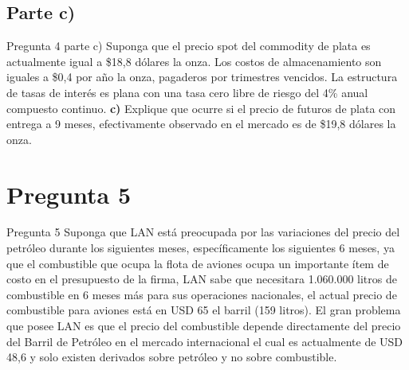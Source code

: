 \documentclass{beamer}
\begin{document}
\subsection{Parte c)}
\begin{frame}{Pregunta 4 parte c)}
  Suponga que el precio spot del commodity de plata es actualmente igual a \$18,8 dólares  
  la onza. Los costos de almacenamiento son iguales a \$0,4 por año la onza, pagaderos por
   trimestres vencidos. La estructura de tasas de interés es plana con una tasa cero libre 
   de riesgo del 4\% anual compuesto continuo.
  \textbf{c)} Explique que ocurre si el precio de futuros de plata con entrega a 9 meses,
  efectivamente observado en el mercado es de \$19,8 dólares la onza.
  
\end{frame}

\section{Pregunta 5}
\begin{frame}{Pregunta 5}
  Suponga que LAN está preocupada por las variaciones del precio del petróleo durante los siguientes meses,
  específicamente los siguientes 6 meses, ya que el combustible que ocupa la flota de aviones ocupa un importante 
  ítem de costo en el presupuesto de la firma, LAN sabe que necesitara 1.060.000 litros de combustible en 6 meses
  más para sus operaciones nacionales, el actual precio de combustible para aviones está en USD 65 el barril (159 litros). 
  El gran problema que posee LAN es que el precio del combustible depende directamente del precio del Barril de Petróleo 
  en el mercado internacional el cual es actualmente de USD 48,6 y solo existen derivados sobre petróleo y no sobre combustible.
  
\end{frame}
\end{document}
